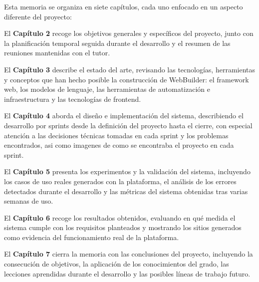 Esta memoria se organiza en siete capítulos, cada uno enfocado en un aspecto diferente del proyecto:

El \textbf{Capítulo 2} recoge los objetivos generales y específicos del proyecto, junto con la planificación temporal seguida durante el desarrollo y el resumen de las reuniones mantenidas con el tutor.

El \textbf{Capítulo 3} describe el estado del arte, revisando las tecnologías, herramientas y conceptos que han hecho posible la construcción de WebBuilder: el framework web, los modelos de lenguaje, las herramientas de automatización e infraestructura y las tecnologías de frontend.

El \textbf{Capítulo 4} aborda el diseño e implementación del sistema, describiendo el desarrollo por sprints desde la definición del proyecto hasta el cierre, con especial atención a las decisiones técnicas tomadas en cada sprint y los problemas encontrados, asi como imagenes de como se encontraba el proyecto en cada sprint.

El \textbf{Capítulo 5} presenta los experimentos y la validación del sistema, incluyendo los casos de uso reales generados con la plataforma, el análisis de los errores detectados durante el desarrollo y las métricas del sistema obtenidas tras varias semanas de uso.

El \textbf{Capítulo 6} recoge los resultados obtenidos, evaluando en qué medida el sistema cumple con los requisitos planteados y mostrando los sitios generados como evidencia del funcionamiento real de la plataforma.

El \textbf{Capítulo 7} cierra la memoria con las conclusiones del proyecto, incluyendo la consecución de objetivos, la aplicación de los conocimientos del grado, las lecciones aprendidas durante el desarrollo y las posibles líneas de trabajo futuro.